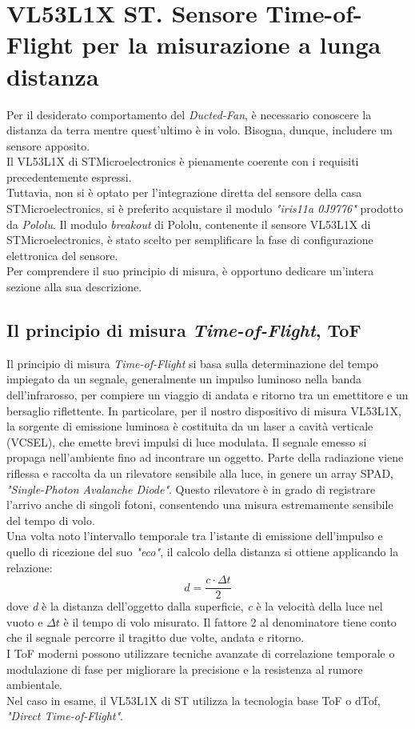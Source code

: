 \section{VL53L1X ST. Sensore Time-of-Flight per la misurazione a lunga distanza}
Per il desiderato comportamento del \textit{Ducted-Fan}, è necessario conoscere la distanza da terra mentre quest'ultimo è in volo. Bisogna, dunque, includere un sensore apposito.\\
Il VL53L1X di STMicroelectronics è pienamente coerente con i requisiti precedentemente espressi.\\
Tuttavia, non si è optato per l'integrazione diretta del sensore della casa STMicroelectronics, si è preferito acquistare il modulo \textit{"iris11a 0J9776"} prodotto da \textit{Pololu}.
Il modulo \textit{breakout} di Pololu, contenente il sensore VL53L1X di STMicroelectronics, è stato scelto per semplificare la fase di configurazione elettronica del sensore.\\
Per comprendere il suo principio di misura, è opportuno dedicare un'intera sezione alla sua descrizione.

\subsection{Il principio di misura \textit{Time-of-Flight}, ToF}
Il principio di misura \textit{Time-of-Flight} si basa sulla determinazione del tempo impiegato da un segnale, generalmente un impulso luminoso nella banda dell'infrarosso, per compiere
un viaggio di andata e ritorno tra un emettitore e un bersaglio riflettente. In particolare, per il nostro dispositivo di misura VL53L1X, la sorgente di emissione luminosa è costituita da
un laser a cavità verticale (VCSEL), che emette brevi impulsi di luce modulata.
Il segnale emesso si propaga nell'ambiente fino ad incontrare un oggetto. Parte della radiazione viene riflessa e raccolta da un rilevatore sensibile alla luce, in genere un array SPAD,
\textit{"Single-Photon Avalanche Diode"}. Questo rilevatore è in grado di registrare l'arrivo anche di singoli fotoni, consentendo una misura estremamente sensibile del tempo di volo.\\
Una volta noto l'intervallo temporale tra l'istante di emissione dell'impulso e quello di ricezione del suo \textit{"eco"}, il calcolo della distanza si ottiene applicando la relazione:
\begin{equation}
    d = \frac{c \cdot \Delta t}{2}
\end{equation}
dove \textit{d} è la distanza dell'oggetto dalla superficie, \textit{c} è la velocità della luce nel vuoto e $\Delta t$ è il tempo di volo misurato. Il fattore 2 al denominatore tiene conto
che il segnale percorre il tragitto due volte, andata e ritorno.\\
I ToF moderni possono utilizzare tecniche avanzate di correlazione temporale o modulazione di fase per migliorare la precisione e la resistenza al rumore ambientale.\\
Nel caso in esame,  il VL53L1X di ST utilizza la tecnologia base ToF o dTof, \textit{"Direct Time-of-Flight"}.\\
